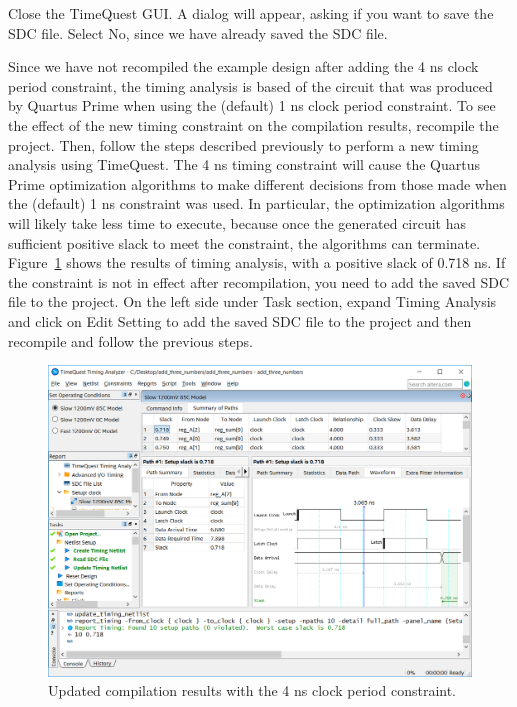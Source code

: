 \documentclass[11pt, twoside, pdftex]{article}
\begin{document}
Close the TimeQuest GUI. A dialog will appear, asking if you want to save the SDC file.
Select {\sf No}, since we have already saved the SDC file.

Since we have not recompiled the example design after adding the 4 ns clock period
constraint, the timing analysis is based of the circuit that was produced by Quartus Prime
when using the (default) 1 ns clock period constraint. To see the effect of the new timing
constraint on the compilation results, recompile the project. Then, follow the steps described
previously to perform a new timing analysis using TimeQuest. The 4 ns timing constraint
will cause the Quartus Prime optimization algorithms to make different decisions from those
made when the (default) 1 ns constraint was used. In particular, the optimization
algorithms will likely take less time to execute, because once the generated circuit has
sufficient positive slack to meet the constraint, the algorithms can terminate. 
Figure~\ref{fig:SB9} shows the results of timing analysis, with a positive slack of 0.718 ns. 
If the constraint is not in effect after recompilation, you need to add the saved SDC file to the project.
On the left side under Task section, expand Timing Analysis and click on Edit Setting to add the saved SDC file to the project and then recompile and follow the previous steps.

\begin{figure}[H]
\begin{center}
\includegraphics[scale=0.5]{figures/SB9.png}
\end{center}
\caption{Updated compilation results with the 4 ns clock period constraint.}
\label{fig:SB9}
\end{figure}
\end{document}
